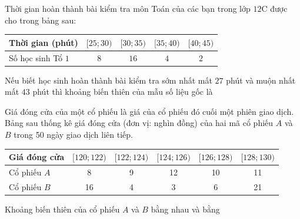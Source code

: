 \begin{ex}[Mức độ 2]%
	Thời gian hoàn thành bài kiểm tra môn Toán của các bạn trong lớp $12$C được cho trong bảng sau:
	\begin{center}
		\begin{tabular}{|l|c|c|c|c|}
			\hline
			Thời gian (phút) & $[25;30 )$ & $[30;35)$ &$[35;40 )$ & $[40;45)$ \\
			\hline
			Số học sinh Tổ $1$ & $8$ & $16$ & $4$ & $2$ \\
			\hline
		\end{tabular}
	\end{center}
	Nếu biết học sinh hoàn thành bài kiểm tra sớm nhất mất $27$ phút và muộn nhất mất $43$ phút thì khoảng biến thiên của mẫu số liệu gốc là
\end{ex}

\begin{ex}[Mức độ 2]%
Giá đóng cửa của một cổ phiếu là giá của cổ phiếu đó cuối một phiên giao dịch. Bảng sau thống kê giá đóng cửa (đơn vị: nghìn đồng) của hai mã cổ phiếu $A$ và $B$ trong 50 ngày giao dịch liên tiếp.
\begin{center}
	\begin{tabular}{|l|c|c|c|c|c|}
		\hline Giá đóng cửa &$[120 ; 122)$ & {$[122 ; 124)$} & {$[124 ; 126)$} & {$[126 ; 128)$} & {$[128 ; 130)$} \\
		\hline Cổ phiếu $A$ & 8 & 9 & 12 & 10 & 11 \\
		\hline Cổ phiếu $B$ & 16 & 4 & 3 & 6 & 21 \\
		\hline
	\end{tabular}
\end{center}
Khoảng biến thiên của cổ phiếu $A$ và $B$ bằng nhau và bằng 
\end{ex}

